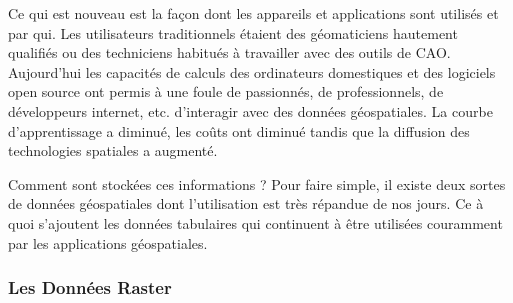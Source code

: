 Ce qui est nouveau est la façon dont les appareils et applications sont utilisés et par qui. Les utilisateurs traditionnels étaient des géomaticiens hautement qualifiés ou des techniciens habitués à travailler avec des outils de CAO. Aujourd'hui les capacités de calculs des ordinateurs domestiques et des logiciels open source ont permis à une foule de passionnés, de professionnels, de développeurs internet, etc. d'interagir avec des données géospatiales. La courbe d'apprentissage a diminué, les coûts ont diminué tandis que la diffusion des technologies spatiales a augmenté.

Comment sont stockées ces informations ? Pour faire simple, il existe deux sortes de données géospatiales dont l'utilisation est très répandue de nos jours. Ce à quoi s'ajoutent les données tabulaires qui continuent à être utilisées couramment par les applications géospatiales.

%
%
%

\subsubsection{Les Données Raster}\label{label_rasterdata}

